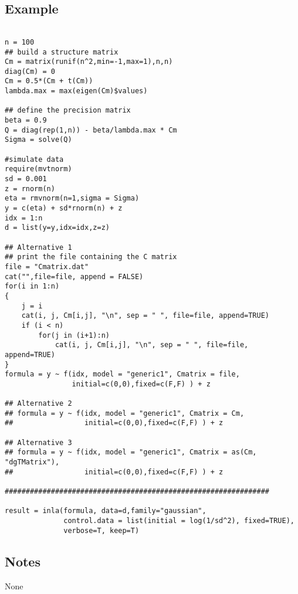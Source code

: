 \documentclass[a4paper,11pt]{article}
\begin{document}
\subsection*{Example}
\begin{verbatim}

n = 100
## build a structure matrix
Cm = matrix(runif(n^2,min=-1,max=1),n,n)
diag(Cm) = 0
Cm = 0.5*(Cm + t(Cm))
lambda.max = max(eigen(Cm)$values)

## define the precision matrix
beta = 0.9
Q = diag(rep(1,n)) - beta/lambda.max * Cm
Sigma = solve(Q)

#simulate data
require(mvtnorm)
sd = 0.001
z = rnorm(n)
eta = rmvnorm(n=1,sigma = Sigma)
y = c(eta) + sd*rnorm(n) + z
idx = 1:n
d = list(y=y,idx=idx,z=z)

## Alternative 1
## print the file containing the C matrix
file = "Cmatrix.dat"
cat("",file=file, append = FALSE)
for(i in 1:n)
{
    j = i
    cat(i, j, Cm[i,j], "\n", sep = " ", file=file, append=TRUE)
    if (i < n)
        for(j in (i+1):n)
            cat(i, j, Cm[i,j], "\n", sep = " ", file=file, append=TRUE)
}
formula = y ~ f(idx, model = "generic1", Cmatrix = file,
                initial=c(0,0),fixed=c(F,F) ) + z

## Alternative 2
## formula = y ~ f(idx, model = "generic1", Cmatrix = Cm,
##                 initial=c(0,0),fixed=c(F,F) ) + z

## Alternative 3
## formula = y ~ f(idx, model = "generic1", Cmatrix = as(Cm, "dgTMatrix"),
##                 initial=c(0,0),fixed=c(F,F) ) + z

###############################################################

result = inla(formula, data=d,family="gaussian",
              control.data = list(initial = log(1/sd^2), fixed=TRUE),
              verbose=T, keep=T)

\end{verbatim}

\subsection*{Notes}
None
\end{document}

